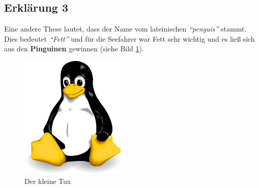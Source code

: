 \documentclass[a4paper, pdftex, ngerman, 11pt]{article}
\begin{document}
\subsection{Erklärung 3}
Eine andere These lautet, dass der Name vom lateinischen \emph{"`penguis"'} stammt. Dies bedeutet \emph{"`Fett"'} und für die Seefahrer war Fett sehr wichtig und es ließ sich aus den \textbf{Pinguinen} gewinnen (siehe Bild \ref{img:tux}).

\begin{figure}[H]
\begin{center}
\includegraphics[width=5cm]{bilder/tux.png}
\caption{Der kleine Tux}
\label{img:tux}
\end{center}
\end{figure}
\end{document}
